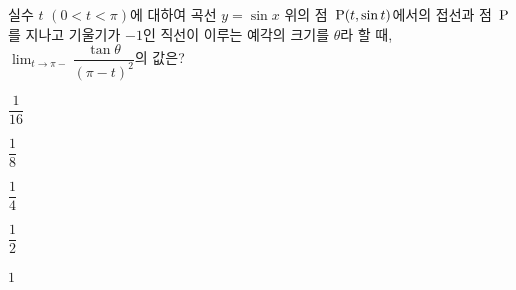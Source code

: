실수 $t$ $(0<t<\pi)$에 대하여 곡선 $y=\sin x$ 위의 점~$\mathrm{P}(t{,}\mkern3mu\mathopen{}\sin t)$에서의 접선과 점~$\mathrm{P}$를 지나고 기울기가 $-1$인 직선이 이루는 예각의 크기를 $\theta$라 할 때, $\displaystyle\lim_{t\to\pi-}\dfrac{\tan\theta}{(\pi-t)^2}$의 값은?
\begin{choices32}{\rule[-3ex]{0pt}{8ex}$\dfrac{1}{16}$}{\rule[-3ex]{0pt}{8ex}$\dfrac{1}{8}$}{\rule[-3ex]{0pt}{8ex}$\dfrac{1}{4}$}{\rule[-3ex]{0pt}{8ex}$\dfrac{1}{2}$}{\rule[-3ex]{0pt}{8ex}$1$}\end{choices32}

